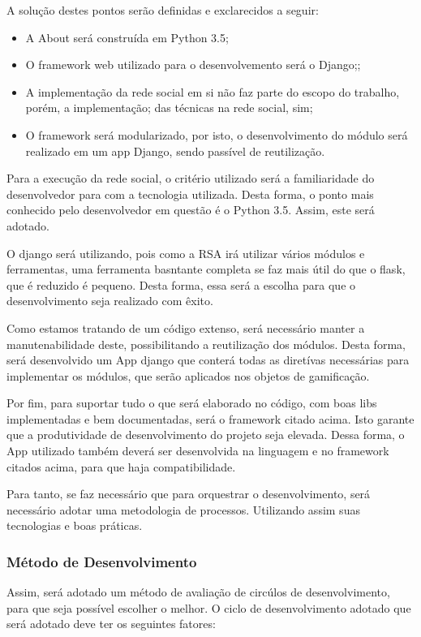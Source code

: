 A solução destes pontos serão definidas e exclarecidos a seguir:

\begin{itemize}
    \item A About será construída em Python 3.5;
    \item  O framework web utilizado para o desenvolvemento será o Django;;
    \item A implementação da rede social em si não faz parte do escopo do trabalho, porém, a implementação;
        das técnicas na rede social, sim;
    \item O framework será modularizado, por isto, o desenvolvimento do módulo será realizado em um app
        Django, sendo passível de reutilização.
\end{itemize}

Para a execução da rede social, o critério utilizado será a familiaridade do desenvolvedor para com a tecnologia
utilizada. Desta forma, o  ponto mais conhecido pelo desenvolvedor em questão é o Python 3.5. Assim, este será adotado.

O django será utilizando, pois como a RSA irá utilizar vários módulos e ferramentas, uma ferramenta  basntante completa
se faz mais útil do que o flask, que é reduzido é pequeno. Desta forma, essa será a escolha para que o desenvolvimento seja
realizado com êxito.

Como estamos tratando de um código extenso, será necessário manter a manutenabilidade deste, possibilitando a reutilização dos
módulos. Desta forma, será desenvolvido um App django que conterá todas as diretívas necessárias para implementar os módulos, que serão aplicados
nos objetos de gamificação.

Por fim, para suportar tudo o que será elaborado no código, com boas libs implementadas e bem documentadas, será o framework citado
acima. Isto garante que a produtividade de desenvolvimento do projeto seja elevada. Dessa forma, o App utilizado também deverá ser
desenvolvida na linguagem e no framework citados acima, para que haja compatibilidade.

Para tanto, se faz necessário que para orquestrar o desenvolvimento, será necessário adotar uma metodologia de processos. Utilizando 
assim suas tecnologias e boas práticas.

\subsubsection{Método de Desenvolvimento}
\label{sub:m_todo_de_desenvolvimento}
Assim, será adotado um método de avaliação de circúlos de desenvolvimento, para que seja possível escolher o melhor.
O ciclo de desenvolvimento adotado que será adotado deve ter os seguintes fatores:

